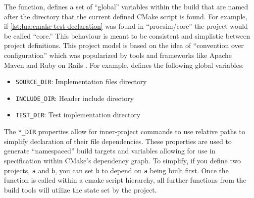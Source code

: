The function,  defines a set of ``global'' variables within the build that are named after the directory that the current defined CMake script is found. For example, if \cref{lst:lua:cmake-test-declaration} was found in ``procsim/core'' the project would be called ``core.'' This behaviour is meant to be consistent and simplistic between project definitions. This project model is based on the idea of ``convention over configuration'' which was popularized by tools and frameworks like Apache Maven and Ruby on Rails \cite{Maven:StandardDirectoryLayout,Heinemeier:RailsDoctrine}. For example,  defines the following global variables: 
\begin{itemize}
    \item \texttt{SOURCE\_DIR}: Implementation files directory
    \item \texttt{INCLUDE\_DIR}: Header include directory
    \item \texttt{TEST\_DIR}: Test implementation directory
\end{itemize}
The \texttt{*\_DIR} properties allow for inner-project commands to use relative paths to simplify declaration of their file dependencies. These properties are used to generate ``namespaced'' build targets and variables allowing for use in specification within CMake's dependency graph. To simplify, if you define two projects, \verb|a| and \verb|b|, you can set \verb|b| to depend on \verb|a| being built first. Once the  function is called within a cmake script hierarchy, all further functions from the build tools will utilize the state set by the project. 

